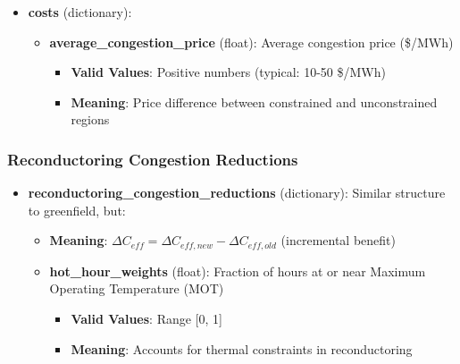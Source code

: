 \documentclass[ctcc_full_documentation.tex]{subfiles}
\begin{document}
\begin{itemize}
\begin{itemize}
\begin{itemize}
            \item \textbf{near\_average\_exceedance} (float): Average MW exceedance during near-binding hours
            \begin{itemize}
                \item \textbf{Valid Values}: Non-negative numbers (MW)
                \item \textbf{Meaning}: Relief during near-binding hours is capped by this value; $E_{near} = \texttt{near\_binding\_hours} \times \min(\Delta C_{eff}, \texttt{near\_average\_exceedance})$ (MWh/year), consistent with binding hours.
            \end{itemize}
            
        \end{itemize}
        
        \item \textbf{costs} (dictionary):
        \begin{itemize}
            \item \textbf{average\_congestion\_price} (float): Average congestion price (\$/MWh)
            \begin{itemize}
                \item \textbf{Valid Values}: Positive numbers (typical: 10-50 \$/MWh)
                \item \textbf{Meaning}: Price difference between constrained and unconstrained regions
            \end{itemize}
        \end{itemize}
    \end{itemize}
\end{itemize}

\subsubsection{Reconductoring Congestion Reductions}

\begin{itemize}
    \item \textbf{reconductoring\_congestion\_reductions} (dictionary): Similar structure to greenfield, but:
    \begin{itemize}
        \item \textbf{Meaning}: $\Delta C_{eff} = \Delta C_{eff,new} - \Delta C_{eff,old}$ (incremental benefit)
        \item \textbf{hot\_hour\_weights} (float): Fraction of hours at or near Maximum Operating Temperature (MOT)
        \begin{itemize}
            \item \textbf{Valid Values}: Range [0, 1]
            \item \textbf{Meaning}: Accounts for thermal constraints in reconductoring
        \end{itemize}
    \end{itemize}
\end{itemize}
\end{document}
